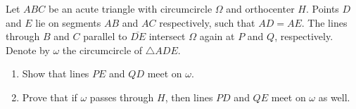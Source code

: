 Let $ABC$ be an acute triangle with circumcircle $\Omega$ and orthocenter $H$. Points $D$ and $E$ lie on segments $AB$ and $AC$ respectively, such that $AD = AE$. The lines through $B$ and $C$ parallel to $\overline{DE}$ intersect $\Omega$ again at $P$ and $Q$, respectively. Denote by $\omega$ the circumcircle of $\triangle ADE$. 
\begin{enumerate}[label=(\alph*)]
	\item Show that lines $PE$ and $QD$ meet on $\omega$.
	\item Prove that if $\omega$ passes through $H$, then lines $PD$ and $QE$ meet on $\omega$ as well.
\end{enumerate}